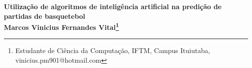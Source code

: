 \begin{center}
\textbf{Utilização de algoritmos de inteligência artificial na predição de partidas de basquetebol \\
Marcos Vinicius Fernandes Vital\footnote[1]{Estudante de Ciência da Computação, IFTM, Campus Ituiutaba, vinicius.pm901@hotmail.com}}
\end{center}